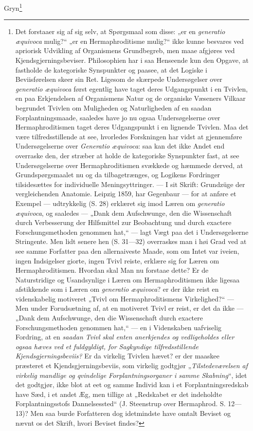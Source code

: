 \documentclass[12pt,a4paper]{book}
\begin{document}
Gryn\footnote{Det forstaaer sig af sig selv, at Spørgsmaal som disse:
„er en \textit{generatio æquivoca} mulig?“ „er en Hermaphroditisme
mulig?“ ikke kunne besvares ved apriorisk Udvikling af Organismens
Grundbegreb, men maae afgjøres ved Kjendsgjerningsbeviser. Philosophien
har i saa Henseende kun den Opgave, at fastholde de kategoriske
Synspunkter og paasee, at det Logiske i Beviisførelsen skeer sin Ret.
Ligesom de skærpede Undersøgelser over \textit{generatio æquivoca} først
egentlig have taget deres Udgangspunkt i en Tvivlen, en paa Erkjendelsen
af Organismens Natur og de organiske Væseners Vilkaar begrundet Tvivlen
om Muligheden og Naturligheden af en saadan Forplantningsmaade, saaledes
have jo nu ogsaa Undersøgelserne over Hermaphroditismen taget deres
Udgangspunkt i en lignende Tvivlen. Maa det være tilfredsstillende at
see, hvorledes Forskningen har vidst at gjennemføre Undersøgelserne over
\textit{Generatio æquivoca}: saa kan det ikke Andet end overraske den,
der stræber at holde de kategoriske Synspunkter fast, at see
Undersøgelserne over Hermaphroditismen svækkede og hæmmede derved, at
Grundspørgsmaalet nu og da tilbagetrænges, og Logikens Fordringer
tilsidesættes for individuelle Meningsyttringer. --- I sit Skrift:
Grundzüge der vergleichenden Anatomie. Leipzig 1859, har Gegenbaur ---
for at anføre et Exempel --- udtrykkelig (S. 28) erklæret sig imod Læren
om \textit{generatio æquivoca}, og saaledes --- „Dank dem Aufschwunge,
den die Wissenschaft durch Verbesserung der Hilfsmittel zur Beobachtung
und durch exactere Forschungsmethoden genommen hat,“ --- lagt Vægt paa
det i Undersøgelserne Stringente. Men lidt senere hen (S. 31---32)
overraskes man i høi Grad ved at see samme Forfatter paa den
allernaiveste Maade, som om Intet var iveien, ingen Indsigelser giorte,
ingen Tvivl reiste, erklære sig for Læren om Hermaphroditismen. Hvordan
skal Man nu forstaae dette? Er de Naturstridige og Usandsynlige i Læren
om Hermaphroditismen ikke ligesaa afstikkende som i Læren om
\textit{generatio æquivoca}? er der ikke reist en videnskabelig motiveret
„Tvivl om Hermaphroditismens Virkelighed?“ --- Men under Forudsætning af,
at en motiveret Tvivl er reist, er det da ikke --- „Dank dem
Aufschwunge, den die Wissenschaft durch exactere Forschungsmethoden
genommen hat,“ --- en i Videnskaben uafviselig Fordring, at en
\emph{saadan Tvivl skal enten anerkjendes og vedligeholdes eller ogsaa
hæves ved et fuldgyldigt, for Sagkyndige tilfredsstillende
Kjendsgjerningsbeviis?} Er da virkelig Tvivlen hævet? er der maaskee
præsteret et Kjendsgjerningsbeviis, som virkelig godtgjør
„\emph{Tilstedeværelsen af virkelig mandlige og qvindelige
Forplantningsorganer i samme Skabning}“, idet det godtgjør, ikke blot at
eet og samme Individ kan i et Forplantningsredskab have Sæd, i et andet
Æg, men tillige at „Redskabet er det indeholdte Forplantningsstofs
Dannelsessted“ (J. Steenstrup over Hermaphrod. S. 12---13)? Men saa burde
Forfatteren dog idetmindste have omtalt Beviset og nævnt os det Skrift,
hvori Beviset findes?

}
\end{document}
